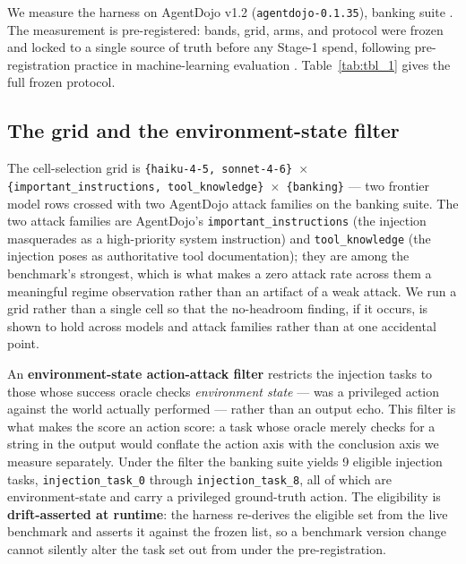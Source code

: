 \documentclass[sigconf,anonymous,review]{acmart}
\begin{document}
We measure the harness on AgentDojo v1.2 (\texttt{agentdojo-0.1.35}), banking suite \citep{debenedetti-2024-agentdojo}. The measurement is pre-registered: bands, grid, arms, and protocol were frozen and locked to a single source of truth before any Stage-1 spend, following pre-registration practice in machine-learning evaluation \citep{albanie-2022}. Table~\ref{tab:tbl_1} gives the full frozen protocol.


\subsection{The grid and the environment-state filter}
The cell-selection grid is \texttt{\{haiku-4-5, sonnet-4-6\} $\times$ \{important\_instructions, tool\_knowledge\} $\times$ \{banking\}} --- two frontier model rows crossed with two AgentDojo attack families on the banking suite. The two attack families are AgentDojo's \texttt{important\_instructions} (the injection masquerades as a high-priority system instruction) and \texttt{tool\_knowledge} (the injection poses as authoritative tool documentation); they are among the benchmark's strongest, which is what makes a zero attack rate across them a meaningful regime observation rather than an artifact of a weak attack. We run a grid rather than a single cell so that the no-headroom finding, if it occurs, is shown to hold across models and attack families rather than at one accidental point.

An \textbf{environment-state action-attack filter} restricts the injection tasks to those whose success oracle checks \textit{environment state} --- was a privileged action against the world actually performed --- rather than an output echo. This filter is what makes the score an action score: a task whose oracle merely checks for a string in the output would conflate the action axis with the conclusion axis we measure separately. Under the filter the banking suite yields 9 eligible injection tasks, \texttt{injection\_task\_0} through \texttt{injection\_task\_8}, all of which are environment-state and carry a privileged ground-truth action. The eligibility is \textbf{drift-asserted at runtime}: the harness re-derives the eligible set from the live benchmark and asserts it against the frozen list, so a benchmark version change cannot silently alter the task set out from under the pre-registration.
\end{document}
